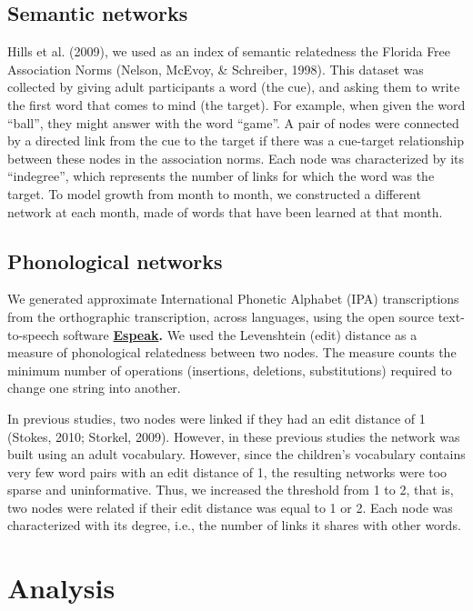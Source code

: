 \documentclass[10pt, letterpaper]{article}
\begin{document}
\subsection{Semantic networks}\label{semantic-networks}

Hills et al. (2009), we used as an index of semantic relatedness the
Florida Free Association Norms (Nelson, McEvoy, \& Schreiber, 1998).
This dataset was collected by giving adult participants a word (the
cue), and asking them to write the first word that comes to mind (the
target). For example, when given the word ``ball'', they might answer
with the word ``game''. A pair of nodes were connected by a directed
link from the cue to the target if there was a cue-target relationship
between these nodes in the association norms. Each node was
characterized by its ``indegree'', which represents the number of links
for which the word was the target. To model growth from month to month,
we constructed a different network at each month, made of words that
have been learned at that month.

\subsection{Phonological networks}\label{phonological-networks}

We generated approximate International Phonetic Alphabet (IPA)
transcriptions from the orthographic transcription, across languages,
using the open source text-to-speech software
\textbf{\href{http://http://espeak.sourceforge.net/}{Espeak}.} We used
the Levenshtein (edit) distance as a measure of phonological relatedness
between two nodes. The measure counts the minimum number of operations
(insertions, deletions, substitutions) required to change one string
into another.

In previous studies, two nodes were linked if they had an edit distance
of 1 (Stokes, 2010; Storkel, 2009). However, in these previous studies
the network was built using an adult vocabulary. However, since the
children's vocabulary contains very few word pairs with an edit distance
of 1, the resulting networks were too sparse and uninformative. Thus, we
increased the threshold from 1 to 2, that is, two nodes were related if
their edit distance was equal to 1 or 2. Each node was characterized
with its degree, i.e., the number of links it shares with other words.

\section{Analysis}\label{analysis}
\end{document}
